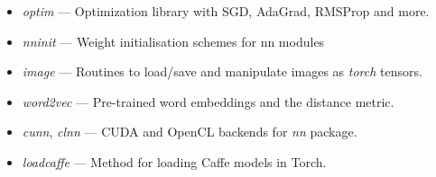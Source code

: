 \vspace{5mm}
\begin{minipage}{0.9\textwidth}
	\begin{itemize}
		\item \emph{optim} --- Optimization library with SGD, AdaGrad, RMSProp and more.
		\item \emph{nninit} --- Weight initialisation schemes for nn modules
		\item \emph{image} --- Routines to load/save and manipulate images as \emph{torch} tensors.
		\item \emph{word2vec} --- Pre-trained word embeddings and the distance metric.
		\item \emph{cunn}, \emph{clnn} --- CUDA and OpenCL backends for \emph{nn} package.
		\item \emph{loadcaffe} --- Method for loading Caffe models in Torch.
	\end{itemize}
\end{minipage}
\vspace{3mm}

